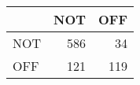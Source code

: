 \begin{tabular}{lrr}
\hline
     &   NOT &   OFF \\
\hline
 NOT &   586 &    34 \\
 OFF &   121 &   119 \\
\hline
\end{tabular}